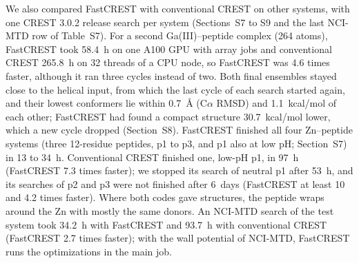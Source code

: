 \documentclass[journal=jctcce,manuscript=article]{achemso}
\begin{document}
We also compared FastCREST with conventional CREST on other systems, with one CREST 3.0.2 release search per system (Sections~S7 to S9 and the last NCI-MTD row of Table~S7). For a second Ga(III)--peptide complex (264 atoms), FastCREST took 58.4~h on one A100 GPU with array jobs and conventional CREST 265.8~h on 32 threads of a CPU node, so FastCREST was 4.6 times faster, although it ran three cycles instead of two. Both final ensembles stayed close to the helical input, from which the last cycle of each search started again, and their lowest conformers lie within 0.7~\AA{} (C$\alpha$ RMSD) and 1.1~kcal/mol of each other; FastCREST had found a compact structure 30.7~kcal/mol lower, which a new cycle dropped (Section~S8). FastCREST finished all four Zn--peptide systems (three 12-residue peptides, p1 to p3, and p1 also at low pH; Section~S7) in 13 to 34~h. Conventional CREST finished one, low-pH p1, in 97~h (FastCREST 7.3 times faster); we stopped its search of neutral p1 after 53~h, and its searches of p2 and p3 were not finished after 6~days (FastCREST at least 10 and 4.2 times faster). Where both codes gave structures, the peptide wraps around the Zn with mostly the same donors. An NCI-MTD search of the test system took 34.2~h with FastCREST and 93.7~h with conventional CREST (FastCREST 2.7 times faster); with the wall potential of NCI-MTD, FastCREST runs the optimizations in the main job.
\end{document}
